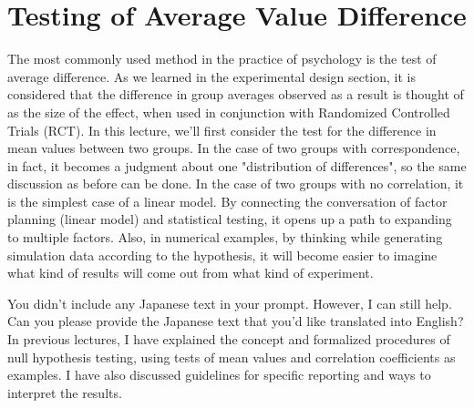 \documentclass{ltjsarticle}
\begin{document}
\chapter{Testing of Average Value Difference}
\label{chapter19}
The most commonly used method in the practice of psychology is the test of average difference. As we learned in the experimental design section, it is considered that the difference in group averages observed as a result is thought of as the size of the effect, when used in conjunction with Randomized Controlled Trials (RCT).
In this lecture, we'll first consider the test for the difference in mean values between two groups. In the case of two groups with correspondence, in fact, it becomes a judgment about one "distribution of differences", so the same discussion as before can be done.
In the case of two groups with no correlation, it is the simplest case of a linear model. By connecting the conversation of factor planning (linear model) and statistical testing, it opens up a path to expanding to multiple factors. Also, in numerical examples, by thinking while generating simulation data according to the hypothesis, it will become easier to imagine what kind of results will come out from what kind of experiment.

You didn't include any Japanese text in your prompt. However, I can still help. Can you please provide the Japanese text that you'd like translated into English?
In previous lectures, I have explained the concept and formalized procedures of null hypothesis testing, using tests of mean values and correlation coefficients as examples. I have also discussed guidelines for specific reporting and ways to interpret the results.
\end{document}
